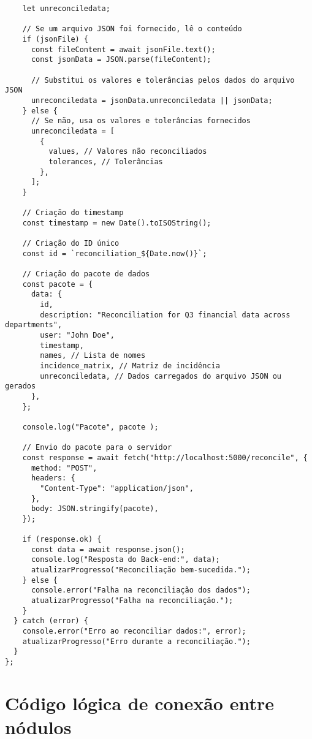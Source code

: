 \begin{verbatim}
    let unreconciledata;

    // Se um arquivo JSON foi fornecido, lê o conteúdo
    if (jsonFile) {
      const fileContent = await jsonFile.text();
      const jsonData = JSON.parse(fileContent);

      // Substitui os valores e tolerâncias pelos dados do arquivo JSON
      unreconciledata = jsonData.unreconciledata || jsonData;
    } else {
      // Se não, usa os valores e tolerâncias fornecidos
      unreconciledata = [
        {
          values, // Valores não reconciliados
          tolerances, // Tolerâncias
        },
      ];
    }

    // Criação do timestamp
    const timestamp = new Date().toISOString();

    // Criação do ID único
    const id = `reconciliation_${Date.now()}`;

    // Criação do pacote de dados
    const pacote = {
      data: {
        id,
        description: "Reconciliation for Q3 financial data across departments",
        user: "John Doe",
        timestamp,
        names, // Lista de nomes
        incidence_matrix, // Matriz de incidência
        unreconciledata, // Dados carregados do arquivo JSON ou gerados
      },
    };

    console.log("Pacote", pacote );

    // Envio do pacote para o servidor
    const response = await fetch("http://localhost:5000/reconcile", {
      method: "POST",
      headers: {
        "Content-Type": "application/json",
      },
      body: JSON.stringify(pacote),
    });

    if (response.ok) {
      const data = await response.json();
      console.log("Resposta do Back-end:", data);
      atualizarProgresso("Reconciliação bem-sucedida.");
    } else {
      console.error("Falha na reconciliação dos dados");
      atualizarProgresso("Falha na reconciliação.");
    }
  } catch (error) {
    console.error("Erro ao reconciliar dados:", error);
    atualizarProgresso("Erro durante a reconciliação.");
  }
};
\end{verbatim}

\chapter{Código lógica de conexão entre nódulos}
\label{Anexo:frontCodeNodeTwoOne}

